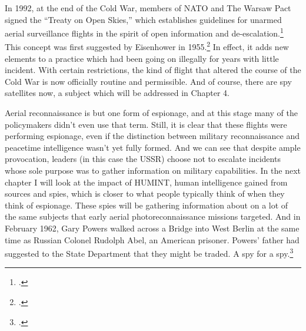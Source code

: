 \documentclass{report}
\begin{document}
\begin{refsegment}
In 1992, at the end of the Cold War, members of NATO and The Warsaw Pact signed the ``Treaty on Open Skies,'' which establishes guidelines for unarmed aerial surveillance flights in the spirit of open information and de-escalation.\footcite{organization_for_security_and_co-operation_in_europe_treaty_1992} This concept was first suggested by Eisenhower in 1955.\footcite{center_for_arms_control_and_non-proliferation_fact_2017} In effect, it adds new elements to a practice which had been going on illegally for years with little incident. With certain restrictions, the kind of flight that altered the course of the Cold War is now officially routine and permissible. And of course, there are spy satellites now, a subject which will be addressed in Chapter 4.

Aerial reconnaissance is but one form of espionage, and at this stage many of the policymakers didn't even use that term. Still, it is clear that these flights were performing espionage, even if the distinction between military reconnaissance and peacetime intelligence wasn't yet fully formed. And we can see that despite ample provocation, leaders (in this case the USSR) choose not to escalate incidents whose sole purpose was to gather information on military capabilities. In the next chapter I will look at the impact of HUMINT, human intelligence gained from sources and spies, which is closer to what people typically think of when they think of espionage. These spies will be gathering information about on a lot of the same subjects that early aerial photoreconnaissance missions targeted. And in February 1962, Gary Powers walked across a Bridge into West Berlin at the same time as Russian Colonel Rudolph Abel, an American prisoner. Powers' father had suggested to the State Department that they might be traded. A spy for a spy.\footcite[p.~239]{powers_operation_2004}


\newpage
\printbibliography[heading=subbibliography]

\end{refsegment}
\end{document}
